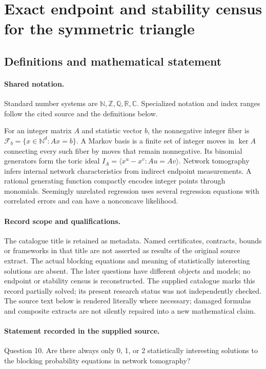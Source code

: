 \documentclass[11pt]{article}
\begin{document}
\section{Exact endpoint and stability census for the symmetric triangle}\label{statement}

\subsection{Definitions and mathematical statement}

\paragraph{Shared notation.}Standard number systems are $\mathbb N,\mathbb Z,\mathbb Q,\mathbb R,\mathbb C$. Specialized notation and index ranges follow the cited source and the definitions below.


For an integer matrix $A$ and statistic vector $b$, the nonnegative integer fiber is $\mathcal F_b=\{x\in\mathbb N^d:Ax=b\}$. A Markov basis is a finite set of integer moves in $\ker A$ connecting every such fiber by moves that remain nonnegative. Its binomial generators form the toric ideal $I_A=\langle x^u-x^v:Au=Av\rangle$. Network tomography infers internal network characteristics from indirect endpoint measurements. A rational generating function compactly encodes integer points through monomials. Seemingly unrelated regression uses several regression equations with correlated errors and can have a nonconcave likelihood.
\paragraph{Record scope and qualifications.}
The catalogue title is retained as metadata. Named certificates, contracts, bounds or frameworks in that title are not asserted as results of the original source extract.
The actual blocking equations and meaning of statistically interesting solutions are absent. The later questions have different objects and models; no endpoint or stability census is reconstructed. The supplied catalogue marks this record partially solved; its present research status was not independently checked.
The source text below is rendered literally where necessary; damaged formulas and composite extracts are not silently repaired into a new mathematical claim.
\paragraph{Statement recorded in the supplied source.}
Question 10. Are there always only 0, 1, or 2 statistically interesting solutions to the blocking probability equations in network tomography?
\end{document}

